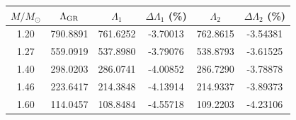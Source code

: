 \begin{tabular}{cccccc}
\hline\hline
$M/M_\odot$ & $\Lambda_{\rm GR}$ & $\Lambda_1$ & $\Delta\Lambda_1$ (\%) & $\Lambda_2$ & $\Delta\Lambda_2$ (\%) \\
\hline
1.20 & 790.8891 & 761.6252 & -3.70013 & 762.8615 & -3.54381 \\
1.27 & 559.0919 & 537.8980 & -3.79076 & 538.8793 & -3.61525 \\
1.40 & 298.0203 & 286.0741 & -4.00852 & 286.7290 & -3.78878 \\
1.46 & 223.6417 & 214.3848 & -4.13914 & 214.9337 & -3.89373 \\
1.60 & 114.0457 & 108.8484 & -4.55718 & 109.2203 & -4.23106 \\
\hline\hline
\end{tabular}
